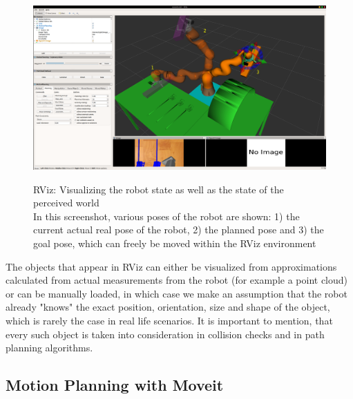 \begin{center}
\begin{figure}[H]
\centering
\includegraphics[width=\textwidth]{images/rviz.png}\\
\caption{RViz: Visualizing the robot state as well as the state of the perceived world\\
In this screenshot, various poses of the robot are shown: 1) the current actual real pose of the robot, 2) the planned pose and 3) the goal pose, which can 
freely be moved within the RViz environment}
\end{figure}
\end{center}

The objects that appear in RViz can either be visualized from approximations calculated from actual measurements from the robot (for example a point cloud) or can be manually loaded, in which case we make 
an assumption that the robot already "knows" the exact position, orientation, size and shape of the object, which is rarely the case in real life scenarios.
It is important to mention, that every such object is taken into consideration in collision checks and in path planning algorithms.

\subsection{Motion Planning with Moveit}

